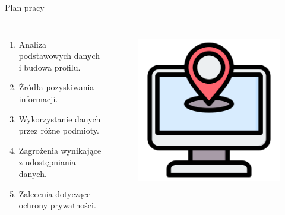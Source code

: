 \begin{frame}{Plan pracy}
  \begin{columns}[c]
    \begin{enumerate}
      \item Analiza podstawowych danych i budowa profilu.
      \item Źródła pozyskiwania informacji.
      \item Wykorzystanie danych przez różne podmioty.
      \item Zagrożenia wynikające z udostępniania danych.
      \item Zalecenia dotyczące ochrony prywatności.
    \end{enumerate}
    \begin{figure}
      \centering
      \includegraphics[height=0.45\textheight]{images/ip-address.png}
      \label{fig:dnaCase}
    \end{figure}
\end{columns}
\end{frame}

